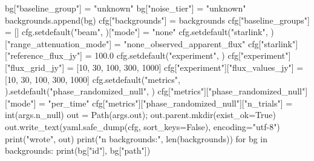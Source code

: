         bg["baseline_group"] = "unknown"
        bg["noise_tier"] = "unknown"
    backgrounds.append(bg)
cfg["backgrounds"] = backgrounds
cfg["baseline_groups"] = []
cfg.setdefault("beam", {})["mode"] = "none"
cfg.setdefault("starlink", {})["range_attenuation_mode"] = "none_observed_apparent_flux"
cfg["starlink"]["reference_flux_jy"] = 100.0
cfg.setdefault("experiment", {})
cfg["experiment"]["flux_grid_jy"] = [10, 30, 100, 300, 1000]
cfg["experiment"]["flux_values_jy"] = [10, 30, 100, 300, 1000]
cfg.setdefault("metrics", {}).setdefault("phase_randomized_null", {})
cfg["metrics"]["phase_randomized_null"]["mode"] = "per_time"
cfg["metrics"]["phase_randomized_null"]["n_trials"] = int(args.n_null)
out = Path(args.out); out.parent.mkdir(exist_ok=True)
out.write_text(yaml.safe_dump(cfg, sort_keys=False), encoding="utf-8")
print("wrote", out)
print("n backgrounds:", len(backgrounds))
for bg in backgrounds:
    print(bg["id"], bg["path"])
